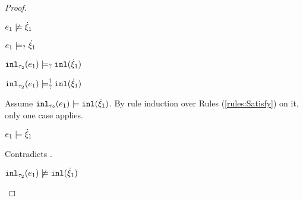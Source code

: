 \begin{proof}
\begin{byCases}
\begin{byCases}
\begin{byCases}
        \item[\cmaysatisfy{e_1}{\hxi_1}]
            \begin{pfsteps*}
            \item $e_1 \not\models \dot{\xi}_1$  
            \item $e_1 \models_{?} \dot{\xi}_1$  
            \item $\mathtt{inl}_{\tau_2}({e_1}) \models_{?} \mathtt{inl}(\dot{\xi}_1)$  
            \item $\mathtt{inl}_{\tau_2}({e_1}) \models_{?}^{\dag} \mathtt{inl}(\dot{\xi}_1)$ 
            \end{pfsteps*}
            Assume $\mathtt{inl}_{\tau_2}({e_1}) \models \mathtt{inl}(\dot{\xi}_1)$. By rule induction over Rules (\ref{rules:Satisfy}) on it, only one case applies.
            \begin{byCases}
            \item[\text{(\ref{rule:CSInl})}]
                \begin{pfsteps*}
                \item $e_1 \models \dot{\xi}_1$
                \end{pfsteps*}
                Contradicts .
            \end{byCases}
            \begin{pfsteps*}
            \item $\mathtt{inl}_{\tau_2}({e_1}) \not\models \mathtt{inl}(\dot{\xi}_1)$ 
            \end{pfsteps*}
           

\end{byCases}
\end{byCases}
\end{byCases}
\end{proof}
